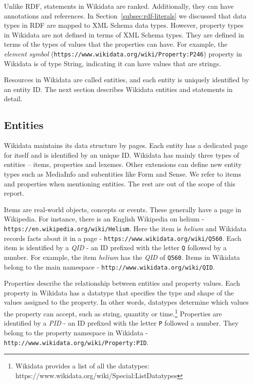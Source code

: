 Unlike RDF, statements in Wikidata are ranked. Additionally, they can have annotations and references. In Section~\ref{subsec:rdf-literals} we discussed that data types in RDF are mapped to XML Schema data types. However, property types in Wikidata are not defined in terms of XML Schema types. They are defined in terms of the types of values that the properties can have. For example, the \textit{element symbol} (\texttt{https://www.wikidata.org/wiki/Property:P246}) property in Wikidata is of type String, indicating it can have values that are strings.

Resources in Wikidata are called entities, and each entity is uniquely identified by an entity ID. The next section describes Wikidata entities and statements in detail.

\subsection{Entities}
Wikidata maintains its data structure by pages. Each entity has a dedicated page for itself and is identified by an unique ID. Wikidata has mainly three types of entities – items, properties and lexemes. Other extensions can define new entity types such as MediaInfo and subentities like Form and Sense. We refer to items and properties when mentioning entities. The rest are out of the scope of this report.

Items are real-world objects, concepts or events. These generally have a page in Wikipedia. For instance, there is an English Wikipedia on helium - \texttt{https://en.wikipedia.org/wiki/Helium}. Here the item is \textit{helium} and Wikidata records facts about it in a page - \texttt{https://www.wikidata.org/wiki/Q560}. Each item is identified by a \textit{QID} - an ID prefixed with the letter \texttt{Q} followed by a number. For example, the item \textit{helium} has the \textit{QID} of \texttt{Q560}. Items in Wikidata belong to the main namespace - \texttt{http://www.wikidata.org/wiki/QID}. 

Properties describe the relationship between entities and property values. Each property in Wikidata has a datatype that specifies the type and shape of the values assigned to the property. In other words, datatypes determine which values the property can accept, such as string, quantity or time.\footnote{Wikidata provides a list of all the datatypes: https://www.wikidata.org/wiki/Special:ListDatatypes} Properties are identified by a \textit{PID} - an ID prefixed with the letter \texttt{P} followed a number. They belong to the property namespace in Wikidata - \texttt{http://www.wikidata.org/wiki/Property:PID}. 

